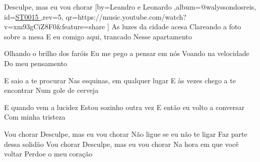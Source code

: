 \beginsong
{Desculpe, mas eu vou chorar %
}[by={Leandro e Leonardo %
},album={@walyssondosreis},
id={\href{https://music.youtube.com/watch?v=xm93gCiZ8F0&feature=share %
}{ST0015 %
}},rev={5}, %
qr={https://music.youtube.com/watch?v=xm93gCiZ8F0&feature=share %
}]
\beginverse
As luzes da cidade acesa
Clareando a foto sobre a mesa
E eu comigo aqui, trancado
Nesse apartamento
\endverse

\beginverse
Olhando o brilho dos faróis
Eu me pego a pensar em nós
Voando na velocidade
Do meu pensamento
\endverse

\beginverse
E saio a te procurar
Nas esquinas, em qualquer lugar
E às vezes chego a te encontrar
Num gole de cerveja
\endverse

\beginverse
E quando vem a lucidez
Estou sozinho outra vez
E então eu volto a conversar
Com minha tristeza
\endverse

\beginchorus
Vou chorar
Desculpe, mas eu vou chorar
Não ligue se eu não te ligar
Faz parte dessa solidão
Vou chorar
Desculpe, mas eu vou chorar
Na hora em que você voltar
Perdoe o meu coração
\endchorus
{}

